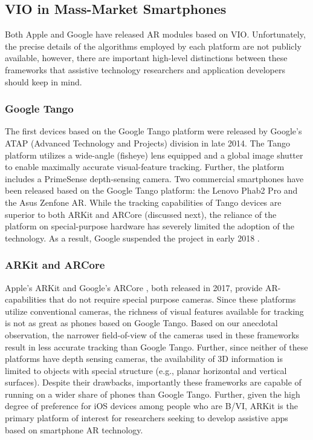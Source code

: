\documentclass[chi_draft]{sigchi}
\newcommand{\BVI}{B/VI\xspace}
\begin{document}
\subsection{VIO in Mass-Market Smartphones}
Both Apple and Google have released AR modules based on VIO.  Unfortunately, the precise details of the algorithms employed by each platform are not publicly available, however, there are important high-level distinctions between these frameworks that assistive technology researchers and application developers should keep in mind.

\subsubsection{Google Tango}
The first devices based on the Google Tango platform were released by Google's ATAP (Advanced Technology and Projects) division in late 2014.  The Tango platform utilizes a wide-angle (fisheye) lens equipped and a global image shutter to enable maximally accurate visual-feature tracking.  Further, the platform includes a PrimeSense depth-sensing camera.  Two commercial smartphones have been released based on the Google Tango platform: the Lenovo Phab2 Pro and the Asus Zenfone AR.  While the tracking capabilities of Tango devices are superior to both ARKit and ARCore (discussed next), the reliance of the platform on special-purpose hardware has severely limited the adoption of the technology.  As a result, Google suspended the project in early 2018 \cite{tangoretired}.


\subsubsection{ARKit and ARCore}

Apple's ARKit \cite{arkit} and Google's ARCore \cite{arcore}, both released in 2017, provide AR-capabilities that do not require special purpose cameras.  Since these platforms utilize conventional cameras, the richness of visual features available for tracking is not as great as phones based on Google Tango.  Based on our anecdotal observation, the narrower field-of-view of the cameras used in these frameworks result in less accurate tracking than Google Tango.  Further, since neither of these platforms have depth sensing cameras, the availability of 3D information is limited to objects with special structure (e.g., planar horizontal and vertical surfaces).  Despite their drawbacks, importantly these frameworks are capable of running on a wider share of phones than Google Tango.  Further, given the high degree of preference for iOS devices among people who are \BVI \cite{morris2014blind}, ARKit is the primary platform of interest for researchers seeking to develop assistive apps based on smartphone AR technology.
\end{document}
